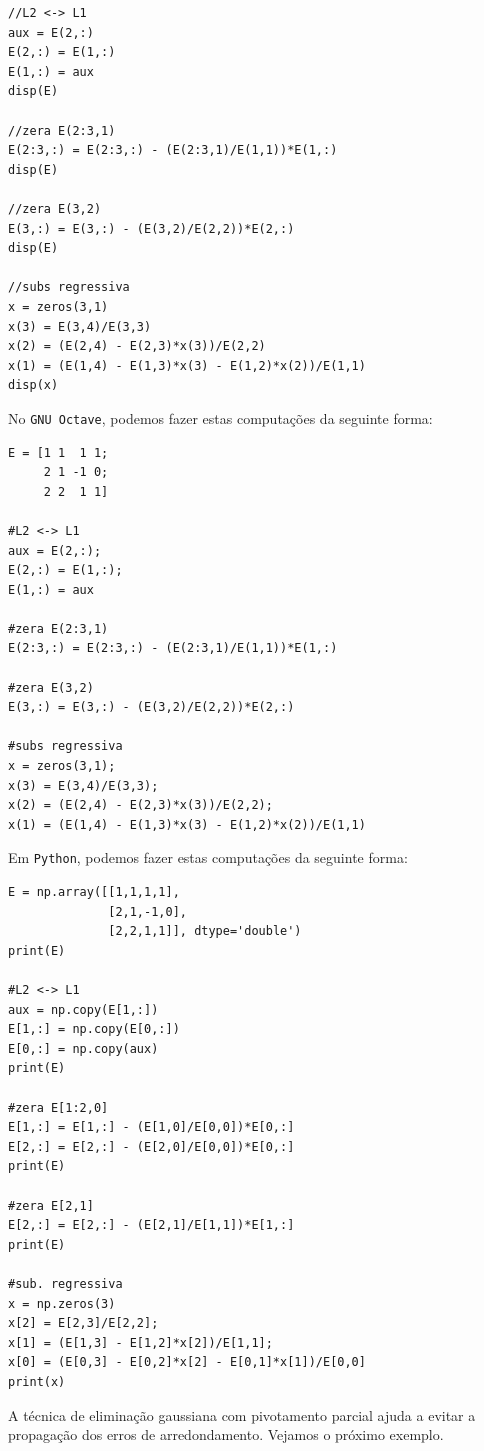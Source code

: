 \begin{sol}
\begin{verbatim}
//L2 <-> L1
aux = E(2,:)
E(2,:) = E(1,:)
E(1,:) = aux
disp(E)

//zera E(2:3,1)
E(2:3,:) = E(2:3,:) - (E(2:3,1)/E(1,1))*E(1,:)
disp(E)

//zera E(3,2)
E(3,:) = E(3,:) - (E(3,2)/E(2,2))*E(2,:)
disp(E)

//subs regressiva
x = zeros(3,1)
x(3) = E(3,4)/E(3,3)
x(2) = (E(2,4) - E(2,3)*x(3))/E(2,2)
x(1) = (E(1,4) - E(1,3)*x(3) - E(1,2)*x(2))/E(1,1)
disp(x)
\end{verbatim}
\fi
\ifisoctave
No \verb+GNU Octave+, podemos fazer estas computações da seguinte forma:
\begin{verbatim}
E = [1 1  1 1;
     2 1 -1 0;
     2 2  1 1]

#L2 <-> L1
aux = E(2,:);
E(2,:) = E(1,:);
E(1,:) = aux

#zera E(2:3,1)
E(2:3,:) = E(2:3,:) - (E(2:3,1)/E(1,1))*E(1,:)

#zera E(3,2)
E(3,:) = E(3,:) - (E(3,2)/E(2,2))*E(2,:)

#subs regressiva
x = zeros(3,1);
x(3) = E(3,4)/E(3,3);
x(2) = (E(2,4) - E(2,3)*x(3))/E(2,2);
x(1) = (E(1,4) - E(1,3)*x(3) - E(1,2)*x(2))/E(1,1)
\end{verbatim}
\fi
\ifispython
Em \verb+Python+, podemos fazer estas computações da seguinte forma:
\begin{verbatim}
E = np.array([[1,1,1,1],
              [2,1,-1,0],
              [2,2,1,1]], dtype='double')
print(E)

#L2 <-> L1
aux = np.copy(E[1,:])
E[1,:] = np.copy(E[0,:])
E[0,:] = np.copy(aux)
print(E)

#zera E[1:2,0]
E[1,:] = E[1,:] - (E[1,0]/E[0,0])*E[0,:]
E[2,:] = E[2,:] - (E[2,0]/E[0,0])*E[0,:]
print(E)

#zera E[2,1]
E[2,:] = E[2,:] - (E[2,1]/E[1,1])*E[1,:]
print(E)

#sub. regressiva
x = np.zeros(3)
x[2] = E[2,3]/E[2,2];
x[1] = (E[1,3] - E[1,2]*x[2])/E[1,1];
x[0] = (E[0,3] - E[0,2]*x[2] - E[0,1]*x[1])/E[0,0]
print(x)
\end{verbatim}
\fi
\end{sol}

A técnica de eliminação gaussiana com pivotamento parcial ajuda a evitar a propagação dos erros de arredondamento. Vejamos o próximo exemplo.

